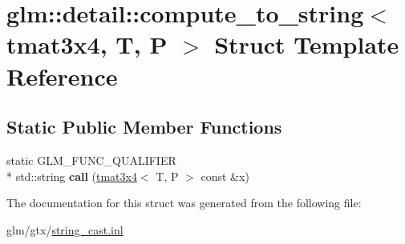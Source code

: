 \hypertarget{structglm_1_1detail_1_1compute__to__string_3_01tmat3x4_00_01T_00_01P_01_4}{\section{glm\-:\-:detail\-:\-:compute\-\_\-to\-\_\-string$<$ tmat3x4, T, P $>$ Struct Template Reference}
\label{structglm_1_1detail_1_1compute__to__string_3_01tmat3x4_00_01T_00_01P_01_4}
}
\subsection*{Static Public Member Functions}
\begin{DoxyCompactItemize}
\item 
\hypertarget{structglm_1_1detail_1_1compute__to__string_3_01tmat3x4_00_01T_00_01P_01_4_ad496094b177c77e467902ffb5bc3b0db}{static G\-L\-M\-\_\-\-F\-U\-N\-C\-\_\-\-Q\-U\-A\-L\-I\-F\-I\-E\-R \\*
std\-::string {\bfseries call} (\hyperlink{structglm_1_1tmat3x4}{tmat3x4}$<$ T, P $>$ const \&x)}\label{structglm_1_1detail_1_1compute__to__string_3_01tmat3x4_00_01T_00_01P_01_4_ad496094b177c77e467902ffb5bc3b0db}

\end{DoxyCompactItemize}


The documentation for this struct was generated from the following file\-:\begin{DoxyCompactItemize}
\item 
glm/gtx/\hyperlink{string__cast_8inl}{string\-\_\-cast.\-inl}\end{DoxyCompactItemize}
